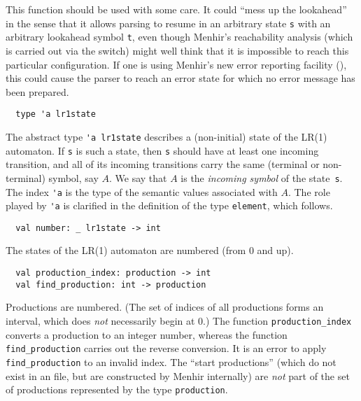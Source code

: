 \documentclass[onecolumn,11pt,nocopyrightspace,preprint]{sigplanconf}
\begin{document}
This function should be used with some care. It could ``mess up the
lookahead'' in the sense that it allows parsing to resume in an arbitrary
state \verb+s+ with an arbitrary lookahead symbol \verb+t+, even though
Menhir's reachability analysis (which is carried out via the \olisterrors
switch) might well think that it is impossible to reach this particular
configuration. If one is using Menhir's new error reporting facility
(), this could cause the parser to reach an error state
for which no error message has been prepared.


\begin{verbatim}
  type 'a lr1state
\end{verbatim}

The abstract type \verb+'a lr1state+ describes a (non-initial) state of the
LR(1) automaton.
%
If \verb+s+ is such a state, then \verb+s+ should have at least one incoming
transition, and all of its incoming transitions carry the same (terminal or
non-terminal) symbol, say $A$. We say that $A$ is the \emph{incoming symbol}
of the state~\verb+s+.
%
The index \verb+'a+ is the type of the semantic values associated with $A$.
The role played by \verb+'a+ is clarified in the definition of the
type \verb+element+, which follows.


\begin{verbatim}
  val number: _ lr1state -> int
\end{verbatim}

The states of the LR(1) automaton are numbered (from 0 and up).


\begin{verbatim}
  val production_index: production -> int
  val find_production: int -> production
\end{verbatim}

Productions are numbered. (The set of indices of all productions forms an
interval, which does \emph{not} necessarily begin at 0.)
%
The function \verb+production_index+ converts a production to an integer
number, whereas the function \verb+find_production+ carries out the reverse
conversion. It is an error to apply \verb+find_production+ to an invalid
index.
%
The ``start productions'' (which do not exist in an \mly file, but are
constructed by Menhir internally) are \emph{not} part of the set of
productions represented by the type \verb+production+.
\end{document}
